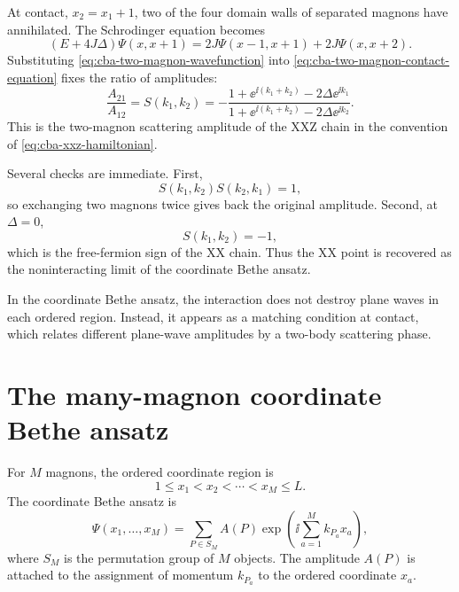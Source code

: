 At contact, $x_2=x_1+1$, two of the four domain walls of separated magnons have
annihilated.  The Schrodinger equation becomes
\begin{equation}
\label{eq:cba-two-magnon-contact-equation}
    (E+4J\Delta)\Psi(x,x+1)
    =
    2J\Psi(x-1,x+1)+2J\Psi(x,x+2).
\end{equation}
Substituting \cref{eq:cba-two-magnon-wavefunction} into
\cref{eq:cba-two-magnon-contact-equation} fixes the ratio of amplitudes:
\begin{equation}
\label{eq:cba-two-magnon-scattering-amplitude}
    \frac{A_{21}}{A_{12}}
    =
    S(k_1,k_2)
    =
    -
    \frac{1+\ee^{\ii(k_1+k_2)}-2\Delta\ee^{\ii k_1}}
         {1+\ee^{\ii(k_1+k_2)}-2\Delta\ee^{\ii k_2}} .
\end{equation}
This is the two-magnon scattering amplitude of the XXZ chain in the convention
of \cref{eq:cba-xxz-hamiltonian}.

Several checks are immediate.  First,
\begin{equation}
\label{eq:cba-S-unitarity}
    S(k_1,k_2)S(k_2,k_1)=1,
\end{equation}
so exchanging two magnons twice gives back the original amplitude.  Second, at
$\Delta=0$,
\begin{equation}
    S(k_1,k_2)=-1,
\end{equation}
which is the free-fermion sign of the XX chain.  Thus the XX point is recovered
as the noninteracting limit of the coordinate Bethe ansatz.

\begin{principle}
In the coordinate Bethe ansatz, the interaction does not destroy plane waves in
each ordered region.  Instead, it appears as a matching condition at contact,
which relates different plane-wave amplitudes by a two-body scattering phase.
\end{principle}

\section{The many-magnon coordinate Bethe ansatz}
\label{sec:cba-many-magnon-wavefunction}

For $M$ magnons, the ordered coordinate region is
\begin{equation}
    1\leq x_1<x_2<\cdots<x_M\leq L .
\end{equation}
The coordinate Bethe ansatz is
\begin{equation}
\label{eq:cba-M-magnon-wavefunction}
    \Psi(x_1,\ldots,x_M)
    =
    \sum_{P\in S_M}A(P)
    \exp\left(\ii\sum_{a=1}^{M}k_{P_a}x_a\right),
\end{equation}
where $S_M$ is the permutation group of $M$ objects.  The amplitude $A(P)$ is
attached to the assignment of momentum $k_{P_a}$ to the ordered coordinate
$x_a$.

